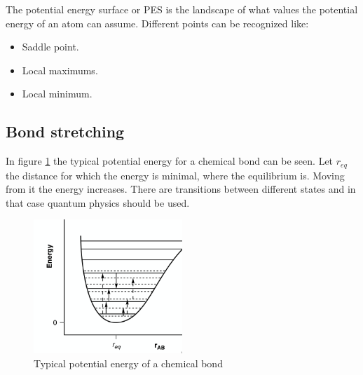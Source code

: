 The potential energy surface or PES is the landscape of what values the potential energy of an atom can assume.
Different points can be recognized like:

\begin{multicols}{2}
	\begin{itemize}
		\item Saddle point.
		\item Local maximums.
		\item Local minimum.
	\end{itemize}
\end{multicols}

	\subsection{Bond stretching}
	In figure \ref{fig:chem-bond} the typical potential energy for a chemical bond can be seen.
	Let $r_{eq}$ the distance for which the energy is minimal, where the equilibrium is.
	Moving from it the energy increases.
	There are transitions between different states and in that case quantum physics should be used.

	\begin{figure}[H]
		\centering
		\includegraphics[width=0.5\textwidth]{chem-bond}
		\caption{Typical potential energy of a chemical bond}
		\label{fig:chem-bond}
	\end{figure}

